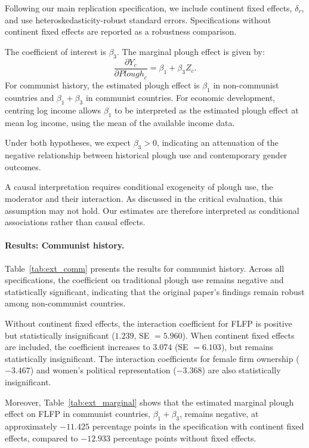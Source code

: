 \documentclass[12pt,a4paper]{article}
\begin{document}
Following our main replication specification, we include continent fixed effects, $\delta_r$, and use heteroskedasticity-robust standard errors. Specifications without continent fixed effects are reported as a robustness comparison.

The coefficient of interest is $\beta_3$. The marginal plough effect is given by: 
\begin{equation}
    \frac{\partial Y_c}{\partial \mathit{Plough}_c}
    = \beta_1 + \beta_3 Z_c.
    \label{eq:marginal_effect}
\end{equation}
For communist history, the estimated plough effect is $\beta_1$ in non-communist countries and $\beta_1+\beta_3$ in communist countries. For economic development, centring log income allows $\beta_1$ to be interpreted as the estimated plough effect at mean log income, using the mean of the available income data.

Under both hypotheses, we expect $\beta_3 > 0$, indicating an attenuation of the negative relationship between historical plough use and contemporary gender outcomes.

A causal interpretation requires conditional exogeneity of plough use, the moderator and their interaction. As discussed in the critical evaluation, this assumption may not hold.  Our estimates are therefore interpreted as conditional associations rather than causal effects.

\paragraph{Results: Communist history.}
Table~\ref{tab:ext_comm} presents the results for communist history. Across all specifications, the coefficient on traditional plough use remains negative and statistically
significant, indicating that the original paper's findings remain robust among non-communist countries.

Without continent fixed effects, the interaction coefficient for FLFP is positive but statistically insignificant ($1.239$, SE $=5.960$). When continent fixed effects are
included, the coefficient increases to $3.074$ (SE $=6.103$), but remains statistically insignificant. The interaction coefficients for female firm ownership ($-3.467$) and women's political representation ($-3.368$) are also statistically insignificant.

Moreover, Table~\ref{tab:ext_marginal} shows that the estimated marginal plough effect on FLFP in communist countries, $\beta_1+\beta_3$, remains negative, at approximately $-11.425$ percentage points in the specification with continent fixed effects, compared to $-12.933$ percentage points without fixed effects.
\end{document}
